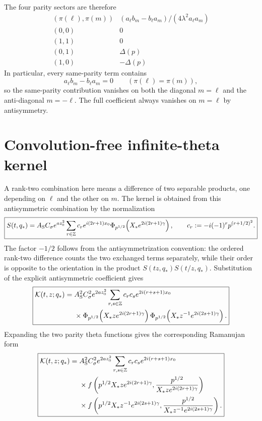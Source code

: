 \documentclass[11pt]{article}
\numberwithin{equation}{section}
\begin{document}
The four parity sectors are therefore
\begin{equation}
\begin{array}{c|c}
(\pi(\ell),\pi(m))&
(a_\ell b_m-b_\ell a_m)/(4\lambda^2a_\ell a_m)\\ \hline
(0,0)&0\\
(1,1)&0\\
(0,1)&\Delta(p)\\
(1,0)&-\Delta(p)
\end{array}
\end{equation}
In particular, every same-parity term contains
\begin{equation}
a_\ell b_m-b_\ell a_m=0\qquad
(\pi(\ell)=\pi(m)),
\end{equation}
so the same-parity contribution vanishes on both the diagonal $m=\ell$ and the anti-diagonal $m=-\ell$. The full coefficient always vanishes on $m=\ell$ by antisymmetry.

\section{Convolution-free infinite-theta kernel}
A rank-two combination here means a difference of two separable products, one depending on $\ell$ and the other on $m$.  The kernel is obtained from this antisymmetric combination by the normalization
\begin{equation}
\boxed{
S(t,q_\ast)=A_{\rm S}C_\sigma e^{az_0^2}
\sum_{r\in\mathbb Z}c_r e^{i(2r+1)x_0}
\Phi_{p^{1/2}}\!\left(X_\ast e^{2i(2r+1)\gamma}\right),
\qquad
c_r:=-i(-1)^r p^{(r+1/2)^2}.
}
\end{equation}
The factor $-1/2$ follows from the antisymmetrization convention: the ordered rank-two difference counts the two exchanged terms separately, while their order is opposite to the orientation in the product $S(tz,q_\ast)S(t/z,q_\ast)$.
Substitution of the explicit antisymmetric coefficient gives
\begin{equation}
\boxed{
\begin{aligned}
\mathcal K(t,z;q_\ast)
={}&A_{\rm S}^2C_\sigma^2e^{2az_0^2}
\sum_{r,s\in\mathbb Z}c_rc_s e^{2i(r+s+1)x_0}\\
&\times\Phi_{p^{1/2}}\!\left(X_\ast z e^{2i(2r+1)\gamma}\right)
\Phi_{p^{1/2}}\!\left(X_\ast z^{-1}e^{2i(2s+1)\gamma}\right).
\end{aligned}}
\end{equation}
Expanding the two parity theta functions gives the corresponding Ramanujan form
\begin{equation}
\boxed{
\begin{aligned}
\mathcal K(t,z;q_\ast)
={}&A_{\rm S}^2C_\sigma^2e^{2az_0^2}
\sum_{r,s\in\mathbb Z}c_rc_s e^{2i(r+s+1)x_0}\\
&\times f\left(p^{1/2}X_\ast z e^{2i(2r+1)\gamma},
\frac{p^{1/2}}{X_\ast z e^{2i(2r+1)\gamma}}\right)\\
&\times f\left(p^{1/2}X_\ast z^{-1}e^{2i(2s+1)\gamma},
\frac{p^{1/2}}{X_\ast z^{-1}e^{2i(2s+1)\gamma}}\right).
\end{aligned}}
\end{equation}
\end{document}
